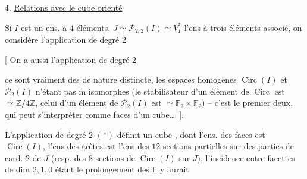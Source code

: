 
4. \uline{Relations avec le cube orienté}

Si $I$ est un ens. à $4$ éléments, $J\simeq\mathscr P_{2,2}(I)\simeq V_I^*$ l'ens à trois éléments associé, on considère l'application de degré $2$


[  On a aussi l'application de degré $2$


ce sont vraiment des  de nature distincte, les espaces homogènes  $\operatorname{Circ}(I)$ et $\mathscr P_2(I)$ n'étant pas $\widetilde{\mathrm m}$ isomorphes (le stabilisateur d'un élément de $\operatorname{Circ}$ est $\simeq\mathbb Z/4\mathbb Z$, celui d'un élément de $\mathscr P_2(I)$ est $\simeq\mathbb F_2\times\mathbb F_2$) -- c'est le premier  deux,  qui peut s'interpréter comme     faces d'un cube\ldots\ ].

L'application de degré $2$ $(*)$ définit un cube , dont l'ens. des faces est $\operatorname{Circ}(I)$,  l'ens des   arêtes  est l'ens des $12$ sections partielles  sur des parties de card. $2$ de $J$ (resp. des  $8$ sections de $\operatorname{Circ}(I)$ sur $J$), l'incidence entre facettes  de dim $2,1,0$ étant le prolongement des   Il y aurait



